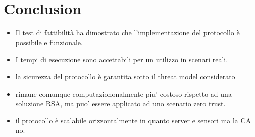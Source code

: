 \section{Conclusion}

\begin{itemize}
    \item Il test di fattibilità ha dimostrato che l'implementazione del protocollo è possibile e funzionale.
    \item I tempi di esecuzione sono accettabili per un utilizzo in scenari reali.
    \item la sicurezza del protocollo è garantita sotto il threat model considerato
    \item rimane comunque computaziononalmente piu' costoso rispetto ad una soluzione RSA, ma puo' essere applicato ad uno scenario zero trust.
    \item il protocollo è scalabile orizzontalmente in quanto server e sensori ma la CA no.
\end{itemize}
